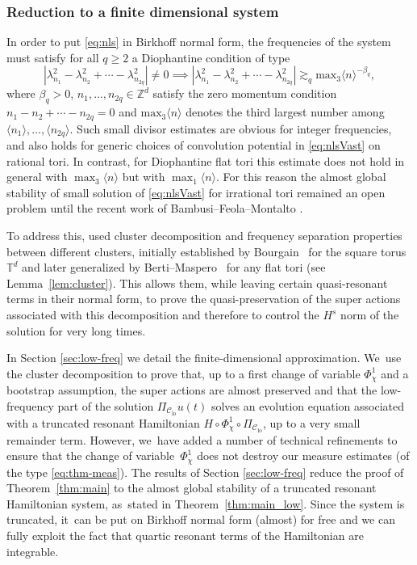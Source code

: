 \documentclass[JEP,XML,SOM,Unicode,published]{cedram}
\theoremstyle{plain}
\theoremstyle{definition}
\DeclareMathOperator{\lo}{lo}
\newcommand{\T}{\mathbb{T}}
\newcommand{\1}{\mathbf{1}}
\newcommand{\Clo}{\mathscr{C}_{\lo}}
\begin{document}
\subsubsection{Reduction to a finite dimensional system}
\label{sub:resonant}

In order to put \eqref{eq:nls} in Birkhoff normal form, the frequencies of the system must satisfy for all $q\geq2$ a Diophantine condition of type
\[
|\lambda_{n_1}^2 -\lambda_{n_2}^2 + \cdots - \lambda_{n_{2q}}^2 | \neq 0 \implies |\lambda_{n_1}^2 -\lambda_{n_2}^2 + \cdots - \lambda_{n_{2q}}^2 | \gtrsim_{q} \mathrm{max}_{3} \langle n \rangle^{-\beta_q},
\]
where $\beta_q>0$, $n_1,\dots,n_{2q}\in \mathbb{Z}^d$ satisfy the zero momentum condition $n_1-n_2 + \cdots -n_{2q}=0$ and $\mathrm{max}_{3} \langle n \rangle$ denotes the third largest number among $\langle n_1 \rangle,\dots, \langle n_{2q} \rangle$. Such small divisor estimates are obvious for integer frequencies, and also holds for generic choices of convolution potential in \eqref{eq:nlsVast} on rational tori. In contrast, for Diophantine flat tori this estimate does not hold in general with $\max_{3}\langle n\rangle$ but with $\max_{1}\langle n\rangle$. For this reason the almost global stability of small solution of \eqref{eq:nlsVast} for irrational tori remained an open problem until the recent work of Bambusi--Feola--Montalto \cite{BFM22}.

To address this, \cite{BFM22} used cluster decomposition and frequency separation properties between different clusters, initially established by Bourgain~\cite{Bou98} for the square torus $\T^d$ and later generalized by Berti--Maspero~\cite{Berti-Maspero-19} for any flat tori (see Lemma~\ref{lem:cluster}). This allows them, while leaving certain quasi-resonant terms in their normal form, to prove the quasi-preservation of the super actions associated with this decomposition and therefore to control the $H^s$ norm of the solution for very long times.

In Section \ref{sec:low-freq} we detail the finite-dimensional approximation. We~use the cluster decomposition to prove that, up to a first change of variable $\Phi_\chi^1$ and a bootstrap assumption, the super actions are almost preserved and that the low-frequency part of the solution $\Pi_{\Clo} u(t) $ solves an evolution equation associated with a truncated resonant Hamiltonian $H \circ \Phi_\chi^1 \circ \Pi_{\Clo}$, up to a very small remainder term. However, we~have added a number of technical refinements to ensure that the change of variable~$\Phi_\chi^1$ does not destroy our measure estimates (of the type \eqref{eq:thm-meas}). The results of Section \ref{sec:low-freq} reduce the proof of Theorem~\ref{thm:main} to the almost global stability of a truncated resonant Hamiltonian system, as~stated in Theorem~\ref{thm:main_low}. Since the system is truncated, it~can be put on Birkhoff normal form
(almost) for free and we can fully exploit the fact that
quartic resonant terms of the Hamiltonian are integrable.
\end{document}
